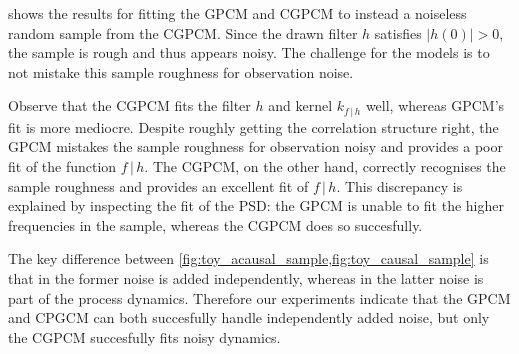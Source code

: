 \documentclass{article}
\newcommand{\cond}{\, | \,}               %
\begin{document}
 shows the results for fitting the GPCM and CGPCM to instead a noiseless random sample from the CGPCM. Since the drawn filter $h$ satisfies $|h(0)|>0$, the sample is rough and thus appears noisy. The challenge for the models is to not mistake this sample roughness for observation noise.

Observe that the CGPCM fits the filter $h$ and kernel $k_{f \cond h}$ well, whereas GPCM's fit is more mediocre. Despite roughly getting the correlation structure right, the GPCM mistakes the sample roughness for observation noisy and provides a poor fit of the function $f\cond h$. The CGPCM, on the other hand, correctly recognises the sample roughness and provides an excellent fit of $f \cond h$. This discrepancy is explained by inspecting the fit of the PSD: the GPCM is unable to fit the higher frequencies in the sample, whereas the CGPCM does so succesfully.

The key difference between \cref{fig:toy_acausal_sample,fig:toy_causal_sample} is that in the former noise is added independently, whereas in the latter noise is part of the process dynamics. Therefore our experiments indicate that the GPCM and CPGCM can both succesfully handle independently added noise, but only the CGPCM succesfully fits noisy dynamics.


\end{document}
